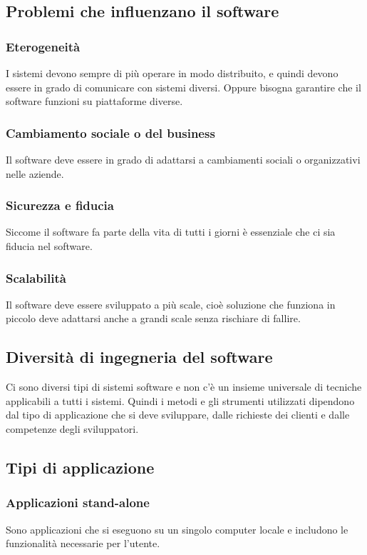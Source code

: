 \documentclass[a4paper]{article}
\begin{document}
\subsection{Problemi che influenzano il software}
\subsubsection{Eterogeneità}
I sistemi devono sempre di più operare in modo distribuito, e quindi devono essere in grado
di comunicare con sistemi diversi. Oppure bisogna garantire che il software funzioni su
piattaforme diverse.

\subsubsection{Cambiamento sociale o del business}
Il software deve essere in grado di adattarsi a cambiamenti sociali o organizzativi
nelle aziende.

\subsubsection{Sicurezza e fiducia}
Siccome il software fa parte della vita di tutti i giorni è essenziale che ci sia
fiducia nel software.

\subsubsection{Scalabilità}
Il software deve essere sviluppato a più scale, cioè soluzione che funziona in piccolo
deve adattarsi anche a grandi scale senza rischiare di fallire.

\subsection{Diversità di ingegneria del software}
Ci sono diversi tipi di sistemi software e non c'è un insieme universale di tecniche
applicabili a tutti i sistemi. Quindi i metodi e gli strumenti utilizzati dipendono
dal tipo di applicazione che si deve sviluppare, dalle richieste dei clienti
e dalle competenze degli sviluppatori.

\subsection{Tipi di applicazione}
\subsubsection{Applicazioni stand-alone}
Sono applicazioni che si eseguono su un singolo computer locale e includono le
funzionalità necessarie per l'utente.
\end{document}
